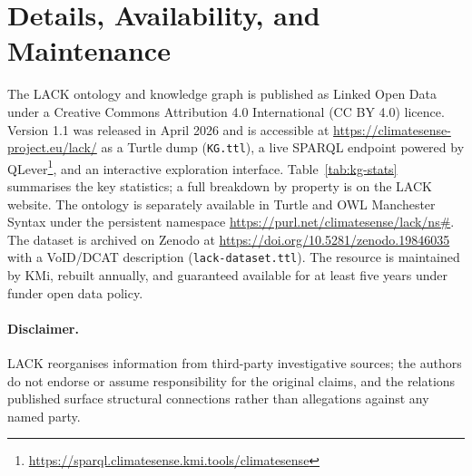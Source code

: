 \section{Details, Availability, and Maintenance}
\label{sec:resource}
\begin{sloppypar}The LACK ontology and knowledge graph is published as Linked Open Data under a Creative Commons Attribution 4.0 International (CC BY 4.0) licence. Version 1.1 was released in April 2026 and is accessible at \url{https://climatesense-project.eu/lack/} as a Turtle dump (\texttt{KG.ttl}), a live SPARQL endpoint powered by QLever\footnote{\url{https://sparql.climatesense.kmi.tools/climatesense}}, and an interactive exploration interface.
Table~\ref{tab:kg-stats} summarises the key statistics; a full breakdown by property is on the LACK website.
The ontology is separately available in Turtle and OWL Manchester Syntax under the persistent namespace \url{https://purl.net/climatesense/lack/ns#}.
The dataset is archived on Zenodo at \url{https://doi.org/10.5281/zenodo.19846035} with a VoID/DCAT description (\texttt{lack-dataset.ttl}).
The resource is maintained by KMi, rebuilt annually, and guaranteed available for at least five years under funder open data policy.
\paragraph{Disclaimer.} LACK reorganises information from third-party investigative sources; the authors do not endorse or assume responsibility for the original claims, and the relations published surface structural connections rather than allegations against any named party.
\end{sloppypar}

